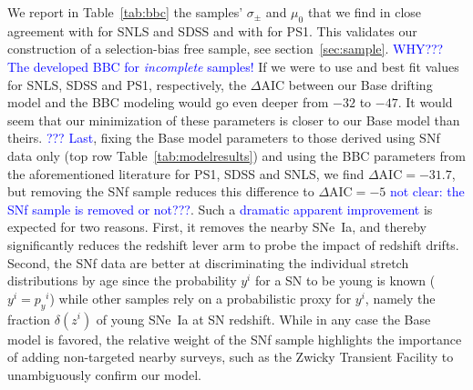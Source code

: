 \documentclass[]{aa} %
\newcommand{\mr}[1]{{\textcolor[rgb]{0.60,0.10,0.6}{#1}}}
\newcommand{\nn}[1]{{\textcolor[rgb]{1, 0.27, 0}{#1}}}
\newcommand{\yc}[1]{{\textcolor{blue}{#1}}}
\begin{document}
\mr{We report in Table~\ref{tab:bbc} the samples' $\sigma_{\pm}$ and
    $\mu_0$ that we find in close agreement with \cite{scolnic2016} for SNLS and
    SDSS and with \cite{scolnic2018a} for PS1. This validates \nn{our} construction
    of \nn{a} selection-bias free sample, see
    section~\ref{sec:sample}. \yc{WHY??? The developed BBC for \textit{incomplete} samples!} If we were to use \cite{scolnic2016} and
    \cite{scolnic2018a} best fit values for SNLS, SDSS and PS1, respectively,
    the $\Delta\mathrm{AIC}$ between our Base drifting model and the BBC
    modeling would go even deeper from $-32$ to $-47$. \nn{It would seem that our minimization
    of these parameters is closer to our Base model than theirs}. \yc{???} \yc{Last},
    fixing the Base model parameters to those derived using SNf data only (top
    row Table~\ref{tab:modelresults}) and using the BBC parameters from the
    aforementioned literature for PS1, SDSS and SNLS, we find
    $\Delta\mathrm{AIC}=-31.7$, but removing the SNf sample reduces this difference to
    $\Delta\mathrm{AIC}=-5$ \yc{not clear: the SNf sample is removed or not???}. Such a \yc{dramatic apparent improvement} is expected for two reasons.
    First, it removes the nearby SNe~Ia, and thereby significantly reduces the
    redshift \nn{lever} arm to probe the impact of redshift drifts.
    Second, the SNf data are better at discriminating the individual stretch
    distributions by age since the probability $y^i$ for a SN to be young is
    known ($y^i = p_y{}^i$) while other samples rely on a probabilistic proxy for
    $y^i$, namely the fraction $\delta(z^i)$ 
    of young SNe~Ia at SN redshift. While in any case the Base model is favored, the relative weight
    of the SNf sample highlights the importance of adding non-targeted nearby
surveys, such as the Zwicky Transient Facility \cite[ZTF,][]{bellm2019,
graham2019} to unambiguously confirm our \nn{model}.}

\end{document}
